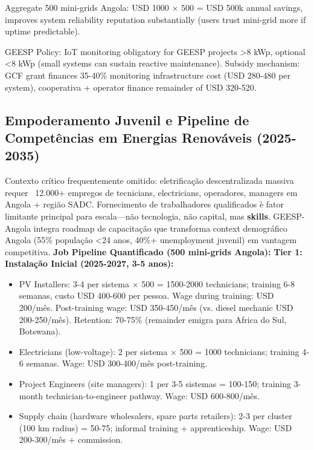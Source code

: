 \documentclass[12pt, a4paper]{article}
\begin{document}
Aggregate 500 mini-grids Angola: USD 1000 × 500 = USD 500k annual savings, improves system reliability reputation substantially (users trust mini-grid more if uptime predictable).

GEESP Policy: IoT monitoring obligatory for GEESP projects >8 kWp, optional <8 kWp (small systems can sustain reactive maintenance). Subsidy mechanism: GCF grant finances 35-40\% monitoring infrastructure cost (USD 280-480 per system), cooperativa + operator finance remainder of USD 320-520.

\subsection{Empoderamento Juvenil e Pipeline de Competências em Energias Renováveis (2025-2035)}

Contexto crítico frequentemente omitido: eletrificação descentralizada massiva requer ~12.000+ empregos de tecnicians, electricians, operadores, managers em Angola + região SADC. Fornecimento de trabalhadores qualificados è fator limitante principal para escala—não tecnologia, não capital, mas
\textbf{skills}. GEESP-Angola integra roadmap de capacitação que transforma context demográfico Angola (55\% população <24 anos, 40\%+ unemployment juvenil) em vantagem competitiva.
\textbf{Job Pipeline Quantificado (500 mini-grids Angola):}
\textbf{Tier 1: Instalação Inicial (2025-2027, 3-5 anos):}
\begin{itemize}
\item PV Installers: 3-4 per sistema × 500 = 1500-2000 technicians; training 6-8 semanas, custo USD 400-600 per pessoa. Wage during training: USD 200/mês. Post-training wage: USD 350-450/mês (vs. diesel mechanic USD 200-250/mês). Retention: 70-75\% (remainder emigra para Africa do Sul, Botswana).

\item Electricians (low-voltage): 2 per sistema × 500 = 1000 technicians; training 4-6 semanas. Wage: USD 300-400/mês post-training.

\item Project Engineers (site managers): 1 per 3-5 sistemas = 100-150; training 3-month technician-to-engineer pathway. Wage: USD 600-800/mês.

\item Supply chain (hardware wholesalers, spare parts retailers): 2-3 per cluster (100 km radius) = 50-75; informal training + apprenticeship. Wage: USD 200-300/mês + commission.
\end{itemize}
\end{document}
